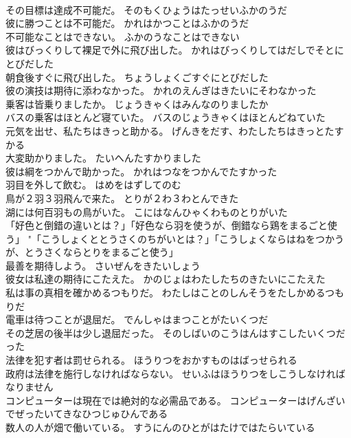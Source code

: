 \documentclass[8pt]{extreport}
\begin{document}
\begin{CJK}{UTF8}{min}
\\	その目標は達成不可能だ。	そのもくひょうはたっせいふかのうだ 
\\	彼に勝つことは不可能だ。	かれはかつことはふかのうだ 
\\	不可能なことはできない。	ふかのうなことはできない 
\\	彼はびっくりして裸足で外に飛び出した。	かれはびっくりしてはだしでそとにとびだした 
\\	朝食後すぐに飛び出した。	ちょうしょくごすぐにとびだした 
\\	彼の演技は期待に添わなかった。	かれのえんぎはきたいにそわなかった 
\\	乗客は皆乗りましたか。	じょうきゃくはみんなのりましたか 
\\	バスの乗客はほとんど寝ていた。	バスのじょうきゃくはほとんどねていた 
\\	元気を出せ、私たちはきっと助かる。	げんきをだす、わたしたちはきっとたすかる 
\\	大変助かりました。	たいへんたすかりました 
\\	彼は綱をつかんで助かった。	かれはつなをつかんでたすかった 
\\	羽目を外して飲む。	はめをはずしてのむ 
\\	鳥が２羽３羽飛んで来た。	とりが２わ３わとんできた 
\\	湖には何百羽もの鳥がいた。	こにはなんひゃくわものとりがいた 
\\	「好色と倒錯の違いとは？」「好色なら羽を使うが、倒錯なら鶏をまるごと使う」	"「こうしょくととうさくのちがいとは？」「こうしょくならはねをつかうが、とうさくならとりをまるごと使う」 
\\	最善を期待しよう。	さいぜんをきたいしょう 
\\	彼女は私達の期待にこたえた。	かのじょはわたしたちのきたいにこたえた 
\\	私は事の真相を確かめるつもりだ。	わたしはことのしんそうをたしかめるつもりだ 
\\	電車は待つことが退屈だ。	でんしゃはまつことがたいくつだ 
\\	その芝居の後半は少し退屈だった。	そのしばいのこうはんはすこしたいくつだった 
\\	法律を犯す者は罰せられる。	ほうりつをおかすものはばっせられる 
\\	政府は法律を施行しなければならない。	せいふはほうりつをしこうしなければなりません 
\\	コンピューターは現在では絶対的な必需品である。	コンピューターはげんざいでぜったいてきなひつじゅひんである 
\\	数人の人が畑で働いている。	すうにんのひとがはたけではたらいている 

\end{CJK}
\end{document}
